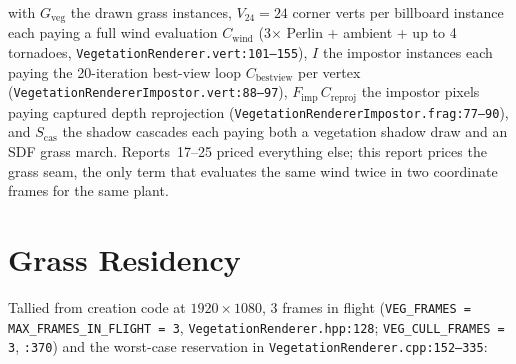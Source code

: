 \documentclass[11pt,a4paper]{article}
\begin{document}
with $G_{\mathrm{veg}}$ the drawn grass instances, $V_{24}=24$ corner verts
per billboard instance each paying a full wind evaluation
$C_{\mathrm{wind}}$ (3$\times$ Perlin + ambient + up to 4 tornadoes,
\texttt{VegetationRenderer.vert:101--155}), $I$ the impostor instances each
paying the 20-iteration best-view loop $C_{\mathrm{bestview}}$ per vertex
(\texttt{VegetationRendererImpostor.vert:88--97}),
$F_{\mathrm{imp}}\,C_{\mathrm{reproj}}$ the impostor pixels paying captured
depth reprojection (\texttt{VegetationRendererImpostor.frag:77--90}), and
$S_{\mathrm{cas}}$ the shadow cascades each paying both a vegetation shadow
draw and an SDF grass march. Reports~17--25 priced everything else; this
report prices the grass seam, the only term that evaluates the same wind
twice in two coordinate frames for the same plant.

\section{Grass Residency}
\label{sec:vram}

Tallied from creation code at $1920\times1080$, 3 frames in flight
(\texttt{VEG\_FRAMES = MAX\_FRAMES\_IN\_FLIGHT = 3},
\texttt{VegetationRenderer.hpp:128}; \texttt{VEG\_CULL\_FRAMES = 3},
\texttt{:370}) and the worst-case reservation in
\texttt{VegetationRenderer.cpp:152--335}:
\end{document}
